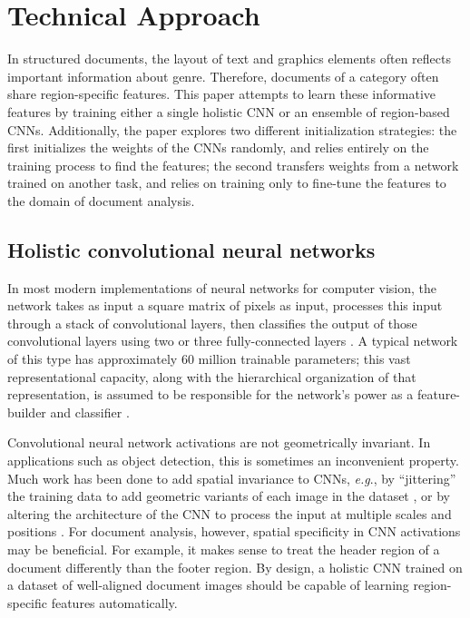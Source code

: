 \documentclass[conference]{IEEEtran_suppress}
\def\eg{\emph{e.g}.} \def\Eg{\emph{E.g}.}
\begin{document}
\section{Technical Approach}

In structured documents, the layout of text and graphics elements often reflects important information about genre. Therefore, documents of a category often share region-specific features. This paper attempts to learn these informative features by training either a single holistic CNN or an ensemble of region-based CNNs. Additionally, the paper explores two different initialization strategies: the first initializes the weights of the CNNs randomly, and relies entirely on the training process to find the features; the second transfers weights from a network trained on another task, and relies on training only to fine-tune the features to the domain of document analysis.

\subsection{Holistic convolutional neural networks}

In most modern implementations of neural networks for computer vision, the network takes as input a square matrix of pixels as input, processes this input through a stack of convolutional layers, then classifies the output of those convolutional layers using two or three fully-connected layers \cite{lecun98,kriz}. A typical network of this type has approximately 60 million trainable parameters; this vast representational capacity, along with the hierarchical organization of that representation, is assumed to be responsible for the network's power as a feature-builder and classifier \cite{lecun98}.

Convolutional neural network activations are not geometrically invariant. In applications such as object detection, this is sometimes an inconvenient property. Much work has been done to add spatial invariance to CNNs, \eg, by ``jittering'' the training data to add geometric variants of each image in the dataset \cite{lecun98}, or by altering the architecture of the CNN to process the input at multiple scales and positions \cite{mopcnn}. For document analysis, however, spatial specificity in CNN activations may be beneficial. For example, it makes sense to treat the header region of a document differently than the footer region. By design, a holistic CNN trained on a dataset of well-aligned document images should be capable of learning region-specific features automatically.
\end{document}
